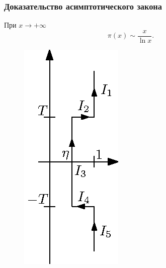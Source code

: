 \subsubsection{Доказательство асимптотического закона}

\begin{theorem}
При $x\to+\infty$ 
$$
	\pi(x)\sim \frac{x}{\ln{x}}.
$$
\end{theorem}
\begin{figure}
\begin{center}
\includegraphics[scale=1.0, trim=20 0 0 0]{pics/05024}
\end{center}
\end{figure}
